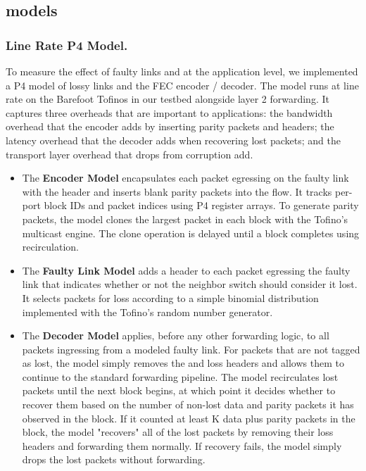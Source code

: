 \subsection{\OurSys models}

\subsubsection{Line Rate P4 Model.} To measure the effect of faulty links and
\OurSys at the application level, we implemented a P4 model of lossy links and 
the FEC encoder / decoder. The model runs at line rate on the
Barefoot Tofinos in our testbed alongside layer 2 forwarding. It captures
three overheads that are important to applications: the bandwidth overhead
that the encoder adds by inserting parity packets and \OurSys headers; the
latency overhead that the decoder adds when recovering lost packets; and the
transport layer overhead that  drops from corruption add.

\begin{itemize}

\item The \textbf{Encoder Model} encapsulates each packet  egressing on the
faulty link with the \OurSys header and inserts blank  parity packets into the
flow. It tracks per-port block IDs and  packet indices using P4 register
arrays. To generate parity packets, the  model clones the largest packet in
each block with the Tofino's multicast engine. The clone operation is 
delayed until a block completes using recirculation.


\item The \textbf{Faulty Link Model} adds a header to each packet egressing
the faulty link that indicates whether or not the neighbor switch should
consider it lost. It selects packets for loss according to a simple binomial
distribution implemented with the Tofino's random number generator. 

\item The \textbf{Decoder Model} applies, before any other forwarding logic,
to all packets ingressing from a modeled faulty link. For packets  that are
not tagged as lost, the model simply removes the \OurSys and loss headers and
allows them to continue to the standard forwarding  pipeline. The model
recirculates  lost packets until the next block begins, at which point it
decides whether  to recover them based on the number of non-lost data and
parity packets it has  observed in the block.  If it counted at least K data
plus parity packets  in the block, the model  "recovers" all of the lost
packets by removing their loss headers and  forwarding them normally. If
recovery fails, the model simply drops the  lost packets without forwarding.

\end{itemize}


